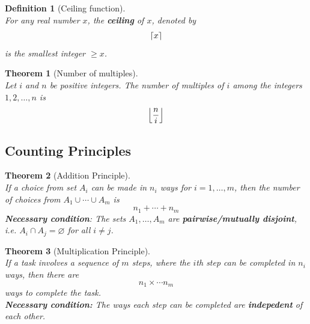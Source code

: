 \documentclass[12pt]{article}
\DeclarePairedDelimiter\ceil{\lceil}{\rceil}
\DeclarePairedDelimiter\floor{\lfloor}{\rfloor}
\newtheorem{definition}{Definition}[section]
\newtheorem{theorem}{Theorem}[section]
\theoremstyle{definition}
\begin{document}
\begin{definition}[Ceiling function]
\hfill\\\normalfont For any real number $x$, the \textbf{ceiling} of $x$, denoted by
\[
\ceil*{x}
\]
is the smallest integer $\geq x$.
\end{definition}
\begin{theorem}[Number of multiples]
\hfill\\\normalfont Let $i$ and $n$ be positive integers. The number of multiples of $i$ among the integers $1,2,\ldots, n$ is 
\[
\floor*{\frac{n}{i}}
\]
\end{theorem}
\subsection{Counting Principles}
\begin{theorem}[Addition Principle]
\hfill\\\normalfont If a choice from set $A_i$ can be made in $n_i$ ways for $i = 1,\ldots, m$, then the number of choices from $A_1\cup \cdots\cup A_m$ is
\[
n_1+\cdots+n_m
\]
\textbf{Necessary condition}: The sets $A_1,\ldots,A_m$ are \textbf{pairwise/mutually disjoint}, i.e. $A_i\cap A_j = \varnothing$ for all $i\neq j$.
\end{theorem}
\begin{theorem}[Multiplication Principle]
\hfill\\\normalfont If a task involves a sequence of $m$ steps, where the $i$th step can be completed in $n_i$ ways, then there are
\[
n_1\times \cdots n_m
\]
ways to complete the task.\\
\textbf{Necessary condition:} The ways each step can be completed are \textbf{indepedent} of each other.
\end{theorem}
\end{document}
